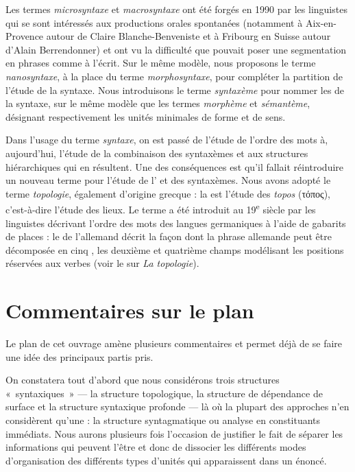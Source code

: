 {    Les termes \textit{microsyntaxe} et \textit{macrosyntaxe} ont été forgés en 1990 par les linguistes qui se sont intéressés aux productions orales spontanées (notamment à Aix-en-Provence autour de Claire Blanche-Benveniste et à Fribourg en Suisse autour d’Alain Berrendonner) et ont vu la difficulté que pouvait poser une segmentation en phrases comme à l’écrit. Sur le même modèle, nous proposons le terme \textit{nanosyntaxe}, à la place du terme \textit{morphosyntaxe}, pour compléter la partition de l’étude de la syntaxe. Nous introduisons le terme \textit{syntaxème} pour nommer les  de la syntaxe, sur le même modèle que les termes \textit{morphème} et \textit{sémantème}, désignant respectivement les unités minimales de forme et de sens.

    Dans l’usage du terme \textit{syntaxe}, on est passé de l’étude de l’ordre des mots à, aujourd’hui, l’étude de la combinaison des syntaxèmes et aux structures hiérarchiques qui en résultent. Une des conséquences est qu’il fallait réintroduire un nouveau terme pour l’étude de l’ et des syntaxèmes. Nous avons adopté le terme \textit{topologie}, également d’origine grecque : la  est l’étude des \textit{topos} (τόπος), c’est-à-dire l’étude des lieux. Le terme a été introduit au 19\textsuperscript{e} siècle par les linguistes décrivant l’ordre des mots des langues germaniques à l’aide de gabarits de places : le  de l’allemand décrit la façon dont la phrase allemande peut être décomposée en cinq , les deuxième et quatrième champs modélisant les positions réservées aux verbes (voir le  sur \textit{La topologie}).
}
\section{Commentaires sur le plan}\label{sec:0.0.10}

Le plan de cet ouvrage amène plusieurs commentaires et permet déjà de se faire une idée des principaux partis pris.

On constatera tout d’abord que nous considérons trois structures «~syntaxiques~» — la structure topologique, la structure de dépendance de surface et la structure syntaxique profonde — là où la plupart des approches n’en considèrent qu’une : la structure syntagmatique ou analyse en constituants immédiats. Nous aurons plusieurs fois l’occasion de justifier le fait de séparer les informations qui peuvent l’être et donc de dissocier les différents modes d’organisation des différents types d’unités qui apparaissent dans un énoncé.

